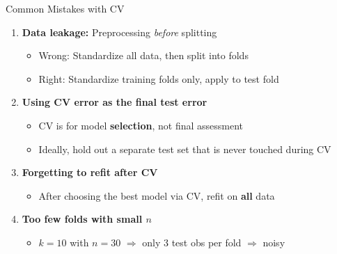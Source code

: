 \documentclass[aspectratio=169, 11pt]{beamer}
\begin{document}
\begin{frame}{Common Mistakes with CV}
\begin{enumerate}
  \item \textbf{Data leakage:} Preprocessing \textit{before} splitting
  \begin{itemize}
    \item[$\circ$] \textcolor{softred}{Wrong:} Standardize all data, then split into folds
    \item[$\circ$] \textcolor{softgreen}{Right:} Standardize training folds only, apply to test fold
  \end{itemize}

  \vspace{0.3em}
  \item \textbf{Using CV error as the final test error}
  \begin{itemize}
    \item[$\circ$] CV is for model \textbf{selection}, not final assessment
    \item[$\circ$] Ideally, hold out a separate test set that is never touched during CV
  \end{itemize}

  \vspace{0.3em}
  \item \textbf{Forgetting to refit after CV}
  \begin{itemize}
    \item[$\circ$] After choosing the best model via CV, refit on \textbf{all} data
  \end{itemize}

  \vspace{0.3em}
  \item \textbf{Too few folds with small $n$}
  \begin{itemize}
    \item[$\circ$] $k = 10$ with $n = 30$ $\Rightarrow$ only 3 test obs per fold $\Rightarrow$ noisy
  \end{itemize}
\end{enumerate}
\end{frame}
\end{document}
